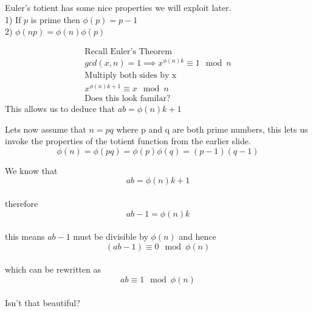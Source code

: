 \documentclass[aspectratio=169]{beamer}
\begin{document}
\begin{frame}
    \begin{center}
        Euler's totient has some nice properties we will exploit later.\\
        \vspace{5mm}
        1) If $p$ is prime then $\phi(p) = p - 1$\\
        2) $\phi(np) = \phi(n)\phi(p)$ 
    \end{center}
\end{frame}

\begin{frame}
    \begin{center}
        \begin{gather*}
            \text{Recall Euler's Theorem}\\
            gcd(x, n) = 1 \implies x^{\phi(n)k} \equiv 1 \mod n\\
            \text{Multiply both sides by x}\\
            x^{\phi(n)k + 1} \equiv x \mod n\\
            \text{Does this look familar?}
        \end{gather*}
        This allows us to deduce that $ab = \phi(n)k+1$
    \end{center}
\end{frame}


\begin{frame}
    \begin{center}
        Lets now assume that $n = pq$ where p and q are both prime numbers, this lets us invoke the properties of the totient function from the earlier slide.
        \vspace{5mm}
        \[\phi(n) = \phi(pq) = \phi(p)\phi(q) = (p-1)(q-1)\]
    \end{center}
\end{frame}

\begin{frame}
    \begin{center}
        We know that
        \[ab = \phi(n)k + 1\]\\
        therefore
        \[ab - 1 = \phi(n)k\]\\
        this means $ab - 1$ must be divisible by $\phi(n)$ and hence
        \[(ab-1) \equiv 0 \mod \phi(n)\]\\
        which can be rewritten as
        \[ab \equiv 1 \mod \phi(n)\]\\
        Isn't that beautiful? 
    \end{center}
\end{frame}
\end{document}
